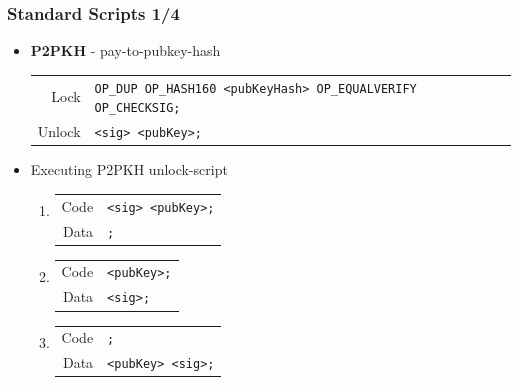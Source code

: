 \documentclass{beamer}
\begin{document}
\begin{frame}[fragile]
  \frametitle{Standard Scripts 1/4}
  \begin{itemize}
  \item \textbf{P2PKH} - pay-to-pubkey-hash
    \break
    \begin{tabular}{rl}
      Lock &\tiny\texttt{OP_DUP OP_HASH160 <pubKeyHash> OP_EQUALVERIFY OP_CHECKSIG;} \\
      Unlock &\tiny\texttt{<sig> <pubKey>;} \\
    \end{tabular}
  \item Executing P2PKH unlock-script
    \begin{enumerate}
    \item
      \begin{tabular}{rl}
        Code &\tiny\texttt{<sig> <pubKey>;} \\
        Data &\tiny\texttt{;} \\
      \end{tabular}
    \item
      \begin{tabular}{rl}
        Code &\tiny\texttt{<pubKey>;} \\
        Data &\tiny\texttt{<sig>;} \\
      \end{tabular}
    \item
      \begin{tabular}{rl}
        Code &\tiny\texttt{;} \\
        Data &\tiny\texttt{<pubKey> <sig>;} \\
      \end{tabular}
    \end{enumerate}
  \end{itemize}
\end{frame}
\end{document}
